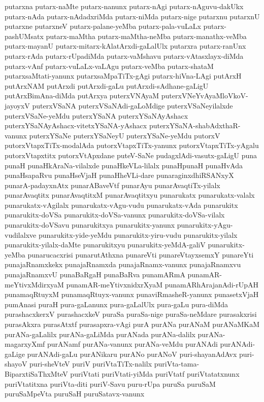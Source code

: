 {putarxna
putarx-naMte
putarx-nanunx
putarx-nAgi
putarx-nAguvu-dakUkx
putarx-nAda
putarx-nAdadxriMda
putarx-niMda
putarx-nige
putarxnu
putarxnU
putarxne
putarxneV
putarx-palane-yeMba
putarx-pala-vuLaLx
putarx-pashUMsatx
putarx-maMtha
putarx-maMtha-neMba
putarx-manathx-veMba
putarx-mayanU
putarx-mitarx-kAlatArxdi-gaLalUlx
putarxra
putarx-ranUnx
putarx-rAda
putarx-rUpadiMda
putarx-vaMshavu
putarx-vAtasxlayx-diMda
putarx-vAnf
putarx-vuLaLx-vaLAgu
putarx-veMba
putarx-shataM
putarxsaMtati-yanunx
putarxsaMpaTiTx-gAgi
putarx-hiVna-LAgi
putArxH
putArxNAM
putArxdi
putArxdi-gaLu
putArxdi-sAdhane-gaLigU
putArxBimAna-diMda
putArxya
puterxVNAyaM
puterxVNeYvAyaMloVkoV-jayoyxV
puterxVSaNA
puterxVSaNAdi-gaLoMdige
puterxVSaNeyilalxde
puterxVSaNe-yeMdu
puterxYSaNA
puterxYSaNAyAshacx
puterxYSaNAyAshacx-vitetxYSaNA-yAshacx
puterxYSaNA-shabAdxthaR-vanunx
puterxYSaNe
puterxYSaNeyU
puterxYSaNe-yeMdu
putorxV
putorxVtapxTiTx-modalAda
putorxVtapxTiTx-yanunx
putorxVtapxTiTx-yAgalu
putorxVtapxtitx
putorxVtApxdane
puteV-SaNe
pudagxlAdi-vasutx-gaLigU
puna
punaH
punaHkAraNa-vilalxde
punaHkeVLa-lilalx
punaHpunaH
punaHvAda
punaHsapaRvu
punaHseVjaH
punaHheVLi-dare
punaraginxdhiRSANxyX
punarA-padayxnAtx
punarABaveVtf
punarAyu
punarAvaqtiTx-yilalx
punarAvaqtitx
punarAvaqtitxM
punarAvaqtitxyu
punarukatx
punarukatx-valalx
punarukatx-vAgilalx
punarukatx-vAgu-vudu
punarukatx-vAda
punarukitx
punarukitx-doVSa
punarukitx-doVSa-vanunx
punarukitx-doVSa-vilalx
punarukitx-doVSavu
punarukitxya
punarukitx-yanunx
punarukitx-yAgu-vudilalxve
punarukitx-yide-yeMdu
punarukitx-yiru-vudu
punarukitx-yilalx
punarukitx-yilalx-daMte
punarukitxyu
punarukitx-yeMdA-galiV
punarukitx-yeMba
punarucacxrisi
punarutAthxna
punareVti
punareVtayxsemxY
punareYti
punajaRnamxkekx
punajaRnamxda
punajaRnamx-vanunx
punajaRnamxvu
punajaRnamxvU
punaBaRgaH
punaBaRva
punamARmA
punamAR-meYtivxMdirxyaM
punamAR-meYtivxnidxrXyaM
punamARhArajanAdi-rUpAH
punamaqRtuyxM
punamaqRtuyx-vanunx
punaviRmasheR-yanunx
punasetxVjaH
pumAnasi
puraH
pura-gaLanunx
pura-gaLalUlx
pura-gaLu
pura-diMda
purashacxkerxV
purashacxkeV
puraSa
puraSa-nige
puraSa-neMdare
purasakxrisi
purasAkxra
purasAtxtf
purasapxra-vAgi
purA
purANa
purANaM
purANaMKaM
purANa-gaLalilx
purANa-gaLiMda
purANada
purANa-dalilx
purANa-magarxyXmf
purANamf
purANa-vanunx
purANa-veMdu
purANAdi
purANAdi-gaLige
purANAdi-gaLu
purANikaru
purANo
purANoV
puri-shayanAdAvx
puri-shayoV
puri-sheVteV
puriV
puriVtaTiTx-nalilx
puriVta-tama-BiparxtiSaThxMteV
puriVtati
puriVtati-yiMda
puriVtatf
puriVtatatxnunx
puriVtatitxna
puriVta-diti
puriV-Savu
puru-rUpa
puruSa
puruSaM
puruSaMpeVta
puruSaH
puruSatavx-vanunx
}
